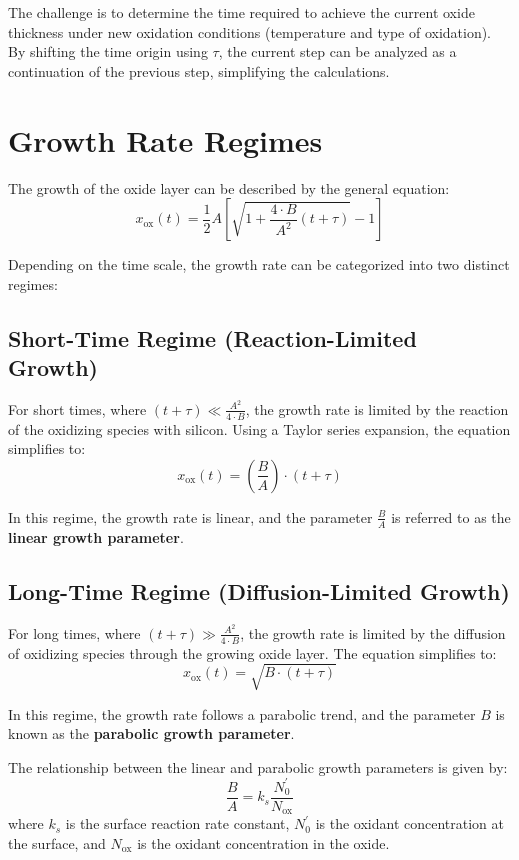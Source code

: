 \documentclass{report}
\begin{document}
The challenge is to determine the time required to achieve the current oxide thickness under new oxidation conditions (temperature and type of oxidation). By shifting the time origin using $\tau$, the current step can be analyzed as a continuation of the previous step, simplifying the calculations.

\section{Growth Rate Regimes}

The growth of the oxide layer can be described by the general equation:
$$
x_{\text{ox}}(t) = \frac{1}{2}A \left[\sqrt{1 + \frac{4 \cdot B}{A^{2}}(t + \tau)} - 1\right] 
$$

Depending on the time scale, the growth rate can be categorized into two distinct regimes:

\subsection{Short-Time Regime (Reaction-Limited Growth)}

For short times, where $(t + \tau) \ll \frac{A^{2}}{4 \cdot B}$, the growth rate is limited by the reaction of the oxidizing species with silicon. Using a Taylor series expansion, the equation simplifies to:
$$
x_{\text{ox}}(t) = \left(\frac{B}{A}\right) \cdot (t + \tau)
$$

In this regime, the growth rate is linear, and the parameter $\frac{B}{A}$ is referred to as the \textbf{linear growth parameter}.

\subsection{Long-Time Regime (Diffusion-Limited Growth)}

For long times, where $(t + \tau) \gg \frac{A^{2}}{4 \cdot B}$, the growth rate is limited by the diffusion of oxidizing species through the growing oxide layer. The equation simplifies to:
$$
x_{\text{ox}}(t) = \sqrt{B \cdot (t + \tau)} 
$$

In this regime, the growth rate follows a parabolic trend, and the parameter $B$ is known as the \textbf{parabolic growth parameter}.

The relationship between the linear and parabolic growth parameters is given by:
$$
\frac{B}{A} = k_{s} \frac{N_{0}^{\prime}}{N_{\text{ox}}}
$$
where $k_{s}$ is the surface reaction rate constant, $N_{0}^{\prime}$ is the oxidant concentration at the surface, and $N_{\text{ox}}$ is the oxidant concentration in the oxide.
\end{document}
